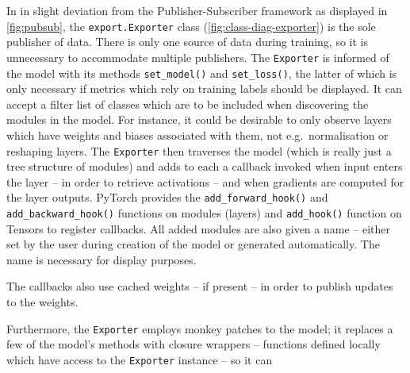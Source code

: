 In in slight deviation from the Publisher-Subscriber framework as displayed in
\cref{fig:pubsub}, the \texttt{export.Exporter} class
(\cref{fig:class-diag-exporter}) is the sole publisher of data. There is only one
source of data during training, so it is unnecessary to accommodate multiple
publishers. The \texttt{Exporter} is informed of the model with its methods
\lstinline{set_model()} and \lstinline{set_loss()}, the latter of which is only
necessary if metrics which rely on training labels should be displayed.  It can
accept a filter list of classes which are to be included when discovering the
modules in the model. For instance, it could be desirable to only observe layers
which have weights and biases associated with them, not e.g.~normalisation or
reshaping layers. The \texttt{Exporter} then traverses the model (which is
really just a tree structure of modules) and adds to each a callback invoked
when input enters the layer -- in order to retrieve activations -- and when
gradients are computed for the layer outputs. PyTorch provides the
\lstinline+add_forward_hook()+ and \lstinline+add_backward_hook()+ functions on
modules (layers) and \lstinline+add_hook()+ function on Tensors to register
callbacks. All added modules are also given a name -- either set by the user
during creation of the model or generated automatically. The name is necessary
for display purposes.

The callbacks also use cached weights -- if present -- in order to publish updates to the weights.

Furthermore, the \lstinline+Exporter+ employs monkey patches to the model; it
replaces a few of the model's methods with closure wrappers -- functions defined
locally which have access to the \lstinline+Exporter+ instance -- so it can

